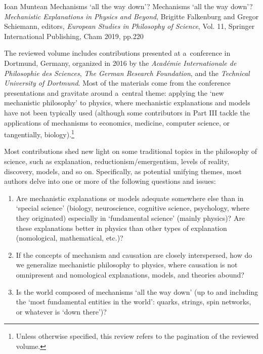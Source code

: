 \begin{recengenv}{Ioan Muntean}
	{Mechanisms ‘all the way down'?}
	{Mechanisms ‘all the way down'?}
	{\textit{Mechanistic Explanations in Physics and Beyond}, Brigitte Falkenburg and Gregor Schiemann, editors, \textit{European Studies in Philosophy of Science}, Vol. 11, Springer International Publishing, Cham 2019, pp.220}
	


\noindent The reviewed volume includes contributions presented at a~conference in Dortmund, Germany, organized in 2016 by the \textit{Académie Internationale de Philosophie des Sciences}, \textit{The German Research Foundation}, and the \textit{Technical University of Dortmund}. Most of the materials come from the conference presentations and gravitate around a~central theme: applying the ‘new mechanistic philosophy' to physics, where mechanistic explanations and models have not been typically used (although some contributors in Part III tackle the applications of mechanisms to economics, medicine, computer science, or tangentially, biology).\footnote{Unless otherwise specified, this review refers to the pagination of the reviewed
\parencite[][]{falkenburg_mechanistic_2019} %
 volume.}

Most contributions shed new light on some traditional topics in the philosophy of science, such as explanation, reductionism/emergentism, levels of reality, discovery, models, and so on. Specifically, as potential unifying themes, most authors delve into one or more of the following questions and issues:

\begin{enumerate}[label={(\arabic*)}]
\item Are mechanistic explanations or models adequate somewhere else than in ‘special science' (biology, neuroscience, cognitive science, psychology, where they originated) especially in ‘fundamental science' (mainly physics)? Are these explanations better in physics than other types of explanation (nomological, mathematical, etc.)?

\item If the concepts of mechanism and causation are closely interspersed, how do we generalize mechanistic philosophy to physics, where causation is not omnipresent and nomological explanations, models, and theories abound?

\item Is the world composed of mechanisms ‘all the way down' (up to and including the ‘most fundamental entities in the world': quarks, strings, spin networks, or whatever is ‘down there')?


\end{enumerate}
\end{recengenv}
